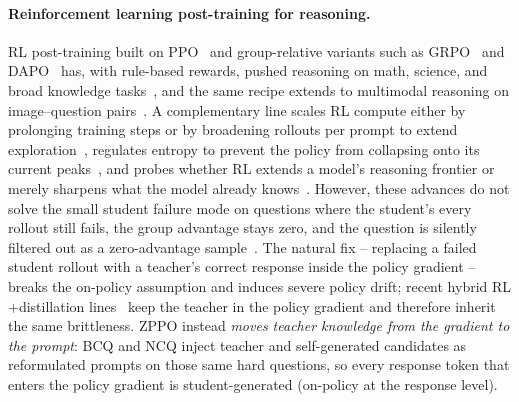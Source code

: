 \documentclass{llmxive}
\begin{document}
\paragraph{Reinforcement learning post-training for reasoning.}
RL post-training built on PPO~\citep{schulman2017proximal} and group-relative variants such as GRPO~\citep{shao2024deepseekmath} and DAPO~\citep{yu2025dapo} has, with rule-based rewards, pushed reasoning on math, science, and broad knowledge tasks~\citep{guo2025deepseek,team2025kimi,liu2025understanding,he2025justrl,khatri2025art,liu2025prorl,hu2025brorl,hu2025reinforce++,liu2025dler,liu2026gdpo}, and the same recipe extends to multimodal reasoning on image--question pairs~\citep{chen2025r1v,yang2025r1,deng2025openvlthinker,zhou2025r1,liu2025visual,chen2025sft,zhou2025reinforced}. A complementary line scales RL compute either by prolonging training steps or by broadening rollouts per prompt to extend exploration~\citep{liu2025prorl,hu2025brorl}, regulates entropy to prevent the policy from collapsing onto its current peaks~\citep{cui2025entropy,wang2025arbitrary}, and probes whether RL extends a model's reasoning frontier or merely sharpens what the model already knows~\citep{yue2025does}. However, these advances do not solve the small student failure mode on questions where the student's every rollout still fails, the group advantage stays zero, and the question is silently filtered out as a zero-advantage sample~\citep{yu2025dapo}. The natural fix -- replacing a failed student rollout with a teacher's correct response inside the policy gradient -- breaks the on-policy assumption and induces severe policy drift; recent hybrid RL$+$distillation lines~\citep{xu2025kdrl,xu2026rlkd} keep the teacher in the policy gradient and therefore inherit the same brittleness. ZPPO instead \emph{moves teacher knowledge from the gradient to the prompt}: BCQ and NCQ inject teacher and self-generated candidates as reformulated prompts on those same hard questions, so every response token that enters the policy gradient is student-generated (on-policy at the response level).
\end{document}

